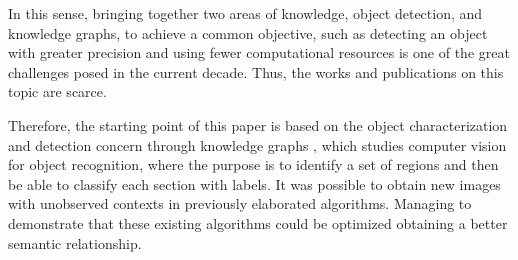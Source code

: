 In this sense, bringing together two areas of knowledge, object detection, and 
knowledge graphs, to achieve a common objective, such as detecting an object 
with greater precision and using fewer computational resources is one of the 
great challenges posed in the current decade. Thus, the works and 
publications on this topic are scarce.

Therefore, the starting point of this paper is based on the object 
characterization and detection concern through knowledge graphs \cite{Fang}, 
which studies computer vision for object recognition, where the purpose is 
to identify a set of regions and then be able to classify each section with 
labels. It was possible to obtain new images with unobserved contexts in 
previously elaborated algorithms. Managing to demonstrate that these existing 
algorithms could be optimized obtaining a better semantic relationship.
